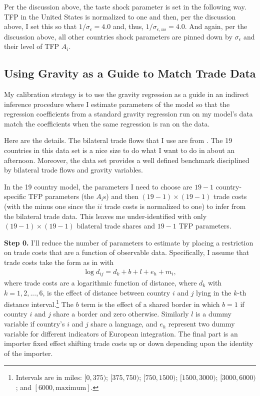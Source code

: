 \documentclass[12pt,pdftex]{article}
\begin{document}
\begin{onehalfspacing}
Per the discussion above, the taste shock parameter is set in the following way. TFP in the United States is normalized to one and then, per the discussion above, I set this so that $1 / \sigma_{\epsilon} = 4.0$ and, thus, $1 / \sigma_{\epsilon,us} = 4.0$. And again, per the discussion above, all other countries shock parameters are pinned down by $\sigma_{\epsilon}$ and their level of TFP $A_i$.

\subsection{Using Gravity as a Guide to Match Trade Data}

My calibration strategy is to use the gravity regression as a guide in an indirect inference procedure where I estimate parameters of the model so that the regression coefficients from a standard gravity regression run on my model's data match the coefficients when the same regression is ran on the data.

Here are the details. The bilateral trade flows that I use are from \citet{eaton2002technology}. The 19 countries in this data set is a nice size to do what I want to do in about an afternoon. Moreover, the \citet{eaton2002technology} data set provides a well defined benchmark disciplined by bilateral trade flows and gravity variables.

In the 19 country model, the parameters I need to choose are $19 - 1$ country-specific TFP parameters (the $A_i$s) and then $(19-1) \times (19-1)$ trade costs (with the minus one since the $ii$ trade costs is normalized to one) to infer from the bilateral trade data. This leaves me under-identified with  only $(19-1) \times (19-1)$ bilateral trade shares and $19 -1$ TFP parameters.

\textbf{Step 0.} I'll reduce the number of parameters to estimate by placing a restriction on trade costs that are a function of observable data. Specifically, I assume that trade costs take the form as in \citet{eaton2002technology} with
\begin{align}
\log d_{ij} = d_{k} + b + l + e_{h} + m_{i},
\label{eq:trade-cost-function}
\end{align}
where trade costs are a logarithmic function of distance, where $d_k$ with $k = 1,2,...,6$, is the effect of distance between country $i$ and $j$ lying in the $k$-th distance interval.\footnote{Intervals are in miles: $[0,375)$; $[375,750)$; $[750,1500)$; $[1500,3000)$; $[3000,6000)$; and $[6000,\mbox{maximum}]$. } The $b$ term is the effect of a shared border in which $b =1$ if country $i$ and $j$ share a border and zero otherwise. Similarly $l$ is a dummy variable if country's $i$ and $j$ share a language, and $e_{h}$ represent two dummy variable for different indicators of European integration. The final part is an importer fixed effect shifting trade costs up or down depending upon the identity of the importer.


\end{onehalfspacing}
\end{document}

